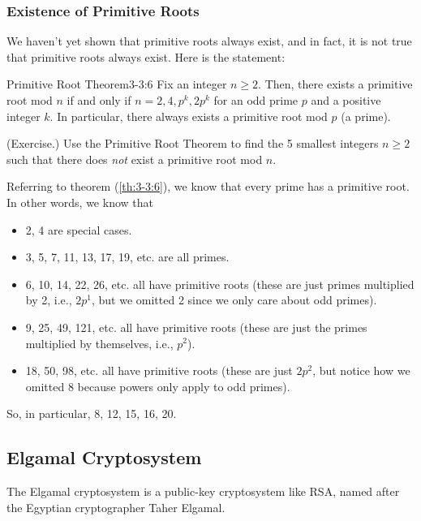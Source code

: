 \documentclass[letterpaper]{article}
\begin{document}
\subsubsection{Existence of Primitive Roots}
We haven't yet shown that primitive roots always exist, and in fact, it is not true that primitive roots always exist. Here is the statement:
\begin{theorem}{Primitive Root Theorem}{3-3:6}
    Fix an integer $n \geq 2$. Then, there exists a primitive root mod $n$ if and only if $n = 2, 4, p^k, 2p^k$ for an odd prime $p$ and a positive integer $k$. In particular, there always exists a primitive root mod $p$ (a prime). 
\end{theorem}

\begin{mdframed}
    (Exercise.) Use the Primitive Root Theorem to find the 5 smallest integers $n \geq 2$ such that there does \emph{not} exist a primitive root mod $n$.

    \begin{mdframed}
        Referring to theorem (\ref{th:3-3:6}), we know that every prime has a primitive root. In other words, we know that 
        \begin{itemize}
            \item 2, 4 are special cases. 
            \item 3, 5, 7, 11, 13, 17, 19, etc. are all primes.
            \item 6, 10, 14, 22, 26, etc. all have primitive roots (these are just primes multiplied by 2, i.e., $2p^1$, but we omitted 2 since we only care about odd primes). 
            \item 9, 25, 49, 121, etc. all have primitive roots (these are just the primes multiplied by themselves, i.e., $p^2$).
            \item 18, 50, 98, etc. all have primitive roots (these are just $2p^2$, but notice how we omitted 8 because powers only apply to odd primes). 
        \end{itemize} 
        So, in particular, 8, 12, 15, 16, 20.
    \end{mdframed}
\end{mdframed}


\subsection{Elgamal Cryptosystem}
The Elgamal cryptosystem is a public-key cryptosystem like RSA, named after the Egyptian cryptographer Taher Elgamal.
\end{document}
